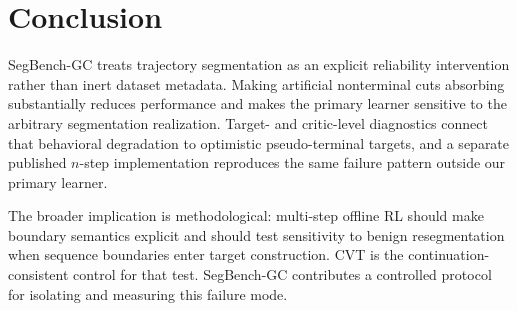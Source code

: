 \section{Conclusion}

SegBench-GC treats trajectory segmentation as an explicit reliability intervention rather than inert dataset metadata. Making artificial nonterminal cuts absorbing substantially reduces performance and makes the primary learner sensitive to the arbitrary segmentation realization. Target- and critic-level diagnostics connect that behavioral degradation to optimistic pseudo-terminal targets, and a separate published $n$-step implementation reproduces the same failure pattern outside our primary learner.

The broader implication is methodological: multi-step offline RL should make boundary semantics explicit and should test sensitivity to benign resegmentation when sequence boundaries enter target construction. CVT is the continuation-consistent control for that test. SegBench-GC contributes a controlled protocol for isolating and measuring this failure mode.
